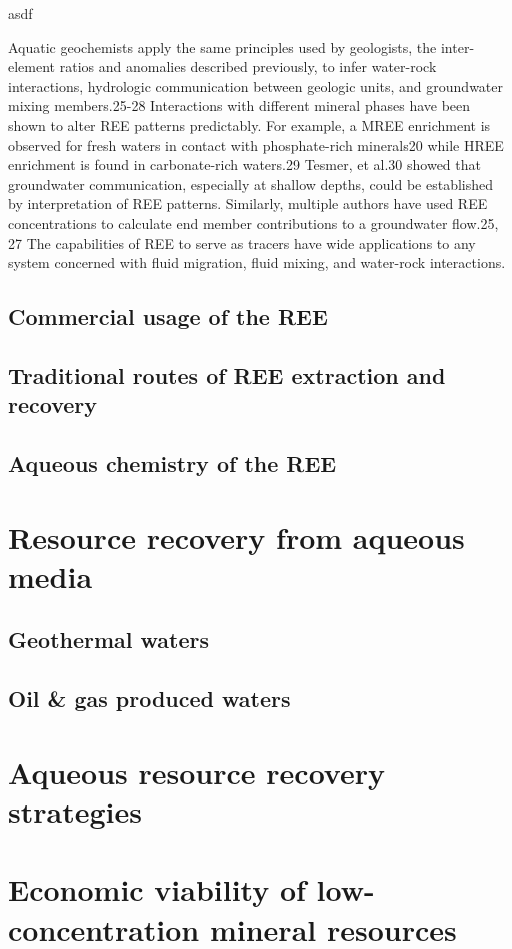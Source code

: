 asdf

Aquatic geochemists apply the same principles used by geologists, the inter-element ratios and anomalies described previously, to infer water-rock interactions, hydrologic communication between geologic units, and groundwater mixing members.25-28
Interactions with different mineral phases have been shown to alter REE patterns predictably.
For example, a MREE enrichment is observed for fresh waters in contact with phosphate-rich minerals20 while HREE enrichment is found in carbonate-rich waters.29 
Tesmer, et al.30 showed that groundwater communication, especially at shallow depths, could be established by interpretation of REE patterns.
Similarly, multiple authors have used REE concentrations to calculate end member contributions to a groundwater flow.25, 27
The capabilities of REE to serve as tracers have wide applications to any system concerned with fluid migration, fluid mixing, and water-rock interactions.

\subsection{Commercial usage of the REE}

\subsection{Traditional routes of REE extraction and recovery}

\subsection{Aqueous chemistry of the REE}


\section{Resource recovery from aqueous media}

\subsection{Geothermal waters}

\subsection{Oil \& gas produced waters}


\section{Aqueous resource recovery strategies}


\section{Economic viability of low-concentration mineral resources}


